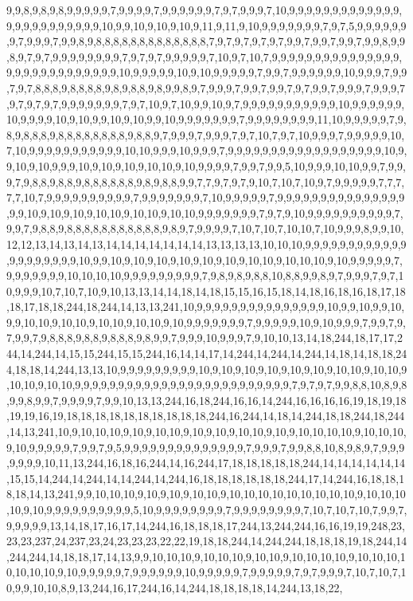 9,9,8,9,8,9,8,9,9,9,9,9,7,9,9,9,9,7,9,9,9,9,9,9,7,9,7,9,9,9,7,10,9,9,9,9,9,9,9,9,9,9,9,9,9,9,9,9,9,9,9,9,9,9,9,9,10,9,9,10,9,10,9,10,9,11,9,11,9,10,9,9,9,9,9,9,9,7,9,7,5,9,9,9,9,9,9,9,7,9,9,9,7,9,9,8,9,8,8,8,8,8,8,8,8,8,8,8,8,8,7,9,7,9,7,9,7,9,7,9,9,7,9,9,7,9,9,7,9,9,8,9,9,8,9,7,9,7,9,9,9,9,9,9,9,9,7,9,7,9,7,9,9,9,9,9,7,10,9,7,10,7,9,9,9,9,9,9,9,9,9,9,9,9,9,9,9,9,9,9,9,9,9,9,9,9,9,9,9,9,10,9,9,9,9,9,10,9,10,9,9,9,9,9,7,9,9,7,9,9,9,9,9,9,10,9,9,9,7,9,9,7,9,7,8,8,8,9,8,8,8,8,9,8,9,8,8,9,8,9,9,8,9,7,9,9,9,7,9,9,7,9,9,7,9,7,9,9,7,9,9,9,7,9,9,9,7,9,7,9,7,9,7,9,9,9,9,9,9,9,7,9,7,10,9,7,10,9,9,10,9,7,9,9,9,9,9,9,9,9,9,9,9,10,9,9,9,9,9,9,10,9,9,9,9,10,9,10,9,9,10,9,10,9,9,10,9,9,9,9,9,9,9,7,9,9,9,9,9,9,9,9,11,10,9,9,9,9,9,7,9,8,9,8,8,8,9,8,8,8,8,8,8,8,8,9,8,8,9,7,9,9,9,7,9,9,9,7,9,7,10,7,9,7,10,9,9,9,7,9,9,9,9,9,10,7,10,9,9,9,9,9,9,9,9,9,9,9,10,10,9,9,9,10,9,9,9,7,9,9,9,9,9,9,9,9,9,9,9,9,9,9,9,9,9,9,10,9,9,10,9,10,9,9,9,10,9,10,9,10,9,10,10,9,10,9,9,9,9,7,9,9,7,9,9,5,10,9,9,9,10,10,9,9,7,9,9,9,7,9,8,8,9,8,8,9,8,8,8,8,8,8,9,8,9,8,8,9,9,7,7,9,7,9,7,9,10,7,10,7,10,9,7,9,9,9,9,9,7,7,7,7,7,10,7,9,9,9,9,9,9,9,9,9,9,7,9,9,9,9,9,9,9,7,10,9,9,9,9,9,7,9,9,9,9,9,9,9,9,9,9,9,9,9,9,9,9,9,10,9,10,9,10,9,10,10,9,10,10,9,10,10,9,9,9,9,9,9,9,7,9,7,9,10,9,9,9,9,9,9,9,9,9,9,7,9,9,7,9,8,8,9,8,8,8,8,8,8,8,8,8,8,8,9,8,9,7,9,9,9,9,7,10,7,10,7,10,10,7,10,9,9,9,8,9,9,10,12,12,13,14,13,14,13,14,14,14,14,14,14,14,13,13,13,13,10,10,10,9,9,9,9,9,9,9,9,9,9,9,9,9,9,9,9,9,9,9,9,10,9,9,10,9,10,9,10,9,10,9,10,9,10,9,10,10,9,10,10,10,9,10,9,9,9,9,9,7,9,9,9,9,9,9,9,10,10,10,10,9,9,9,9,9,9,9,9,9,7,9,8,9,8,9,8,8,10,8,8,9,9,8,9,7,9,9,9,7,9,7,10,9,9,9,10,7,10,7,10,9,10,13,13,14,14,18,14,18,15,15,16,15,18,14,18,16,18,16,18,17,18,18,17,18,18,244,18,244,14,13,13,241,10,9,9,9,9,9,9,9,9,9,9,9,9,9,9,9,10,9,9,10,9,9,10,9,9,10,10,9,10,10,9,10,10,9,10,10,9,10,9,9,9,9,9,9,9,7,9,9,9,9,9,10,9,10,9,9,9,7,9,9,7,9,7,9,9,7,9,8,8,8,9,8,8,9,8,8,8,9,8,9,9,7,9,9,9,10,9,9,9,7,9,10,10,13,14,18,244,18,17,17,244,14,244,14,15,15,244,15,15,244,16,14,14,17,14,244,14,244,14,244,14,18,14,18,18,244,18,18,14,244,13,13,10,9,9,9,9,9,9,9,9,9,10,9,10,9,10,9,10,9,10,9,10,9,10,10,9,10,10,9,10,10,9,10,10,9,9,9,9,9,9,9,9,9,9,9,9,9,9,9,9,9,9,9,9,9,9,9,9,9,7,9,7,9,7,9,9,8,8,10,8,9,8,9,9,8,9,9,7,9,9,9,9,7,9,9,10,13,13,244,16,18,244,16,16,14,244,16,16,16,16,19,18,19,18,19,19,16,19,18,18,18,18,18,18,18,18,18,18,244,16,244,14,18,14,244,18,18,244,18,244,14,13,241,10,9,10,10,10,9,10,9,10,10,9,10,9,10,9,10,10,9,10,9,10,10,10,10,9,10,10,10,9,10,9,9,9,9,9,7,9,9,7,9,5,9,9,9,9,9,9,9,9,9,9,9,9,9,9,7,9,9,9,7,9,9,8,8,10,8,9,8,9,7,9,9,9,9,9,9,9,10,11,13,244,16,18,16,244,14,16,244,17,18,18,18,18,18,244,14,14,14,14,14,14,15,15,14,244,14,244,14,14,244,14,244,16,18,18,18,18,18,18,244,17,14,244,16,18,18,18,18,14,13,241,9,9,10,10,10,9,10,9,10,9,10,10,9,10,10,10,10,10,10,10,10,10,9,10,10,10,10,9,10,9,9,9,9,9,9,9,9,9,9,5,10,9,9,9,9,9,9,9,9,7,9,9,9,9,9,9,9,9,7,10,7,10,7,10,7,9,9,7,9,9,9,9,9,13,14,18,17,16,17,14,244,16,18,18,18,17,244,13,244,244,16,16,19,19,248,23,23,23,237,24,237,23,24,23,23,23,22,22,19,18,18,244,14,244,244,18,18,18,19,18,244,14,244,244,14,18,18,17,14,13,9,9,10,10,10,9,10,10,10,9,10,10,9,10,10,10,10,9,10,10,10,10,10,10,10,9,10,9,9,9,9,9,7,9,9,9,9,9,9,10,9,9,9,9,9,7,9,9,9,9,9,7,9,7,9,9,9,7,10,7,10,7,10,9,9,10,10,8,9,13,244,16,17,244,16,14,244,18,18,18,18,14,244,13,18,22,